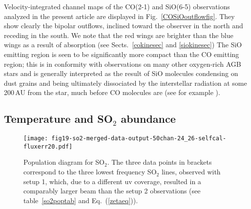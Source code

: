 \documentclass{aa}
\begin{document}
Velocity-integrated channel maps of the CO(2-1) and SiO(6-5)
observations  analyzed in the present article are displayed in
Fig.~\ref{COSiOoutflowfig}.  They show clearly the bipolar outflows,
inclined toward the observer in the north and receding in the south.
We note that the red wings are brighter than the blue wings as a
result of  absorption (see Sects.~\ref{cokinesec} and
\ref{siokinesec}) The SiO emitting region is seen to be  significantly
more compact than the CO emitting region; this is in conformity with
observations on many other oxygen-rich AGB stars and is generally
interpreted as the result of SiO molecules condensing on dust grains
and being ultimately dissociated by the interstellar radiation at some
200\,AU from the star, much before CO molecules are (see for example
\citet{sowlk2004}). 

\subsection{Temperature and SO$_2$ abundance}
\label{thermalsec} 

\begin{figure}[ht]
    \centering
    \vspace{-4.5cm}
    \texttt{[image: fig19-so2-merged-data-output-50chan-24\_26-selfcal-fluxerr20.pdf]}
    \caption{Population diagram for SO$_2$. The three data points in
        brackets correspond to the three lowest frequency SO$_2$ lines,
        observed with setup 1, which, due to a different uv coverage, resulted
        in a comparably larger beam than the setup 2 observations
        (see table~\ref{so2poptab} and Eq.~(\ref{zetaeq})).}
    \label{so2popfig}
\end{figure}
\end{document}
